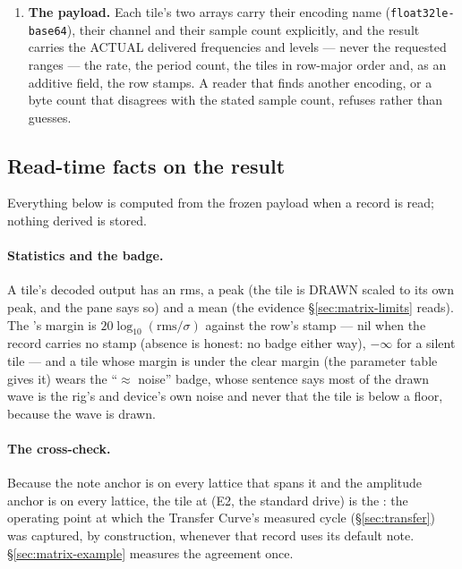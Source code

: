 \documentclass[11pt,a4paper]{article}
\begin{document}
{\begin{enumerate}
\item \textbf{The payload.} Each tile's two arrays carry their encoding
name (\texttt{float32le-base64}), their channel and their sample count
explicitly, and the result carries the ACTUAL delivered frequencies and
levels --- never the requested ranges --- the rate, the period count, the
tiles in row-major order and, as an additive field, the row stamps. A
reader that finds another encoding, or a byte count that disagrees with
the stated sample count, refuses rather than guesses.
\end{enumerate}
\par}

\subsection{Read-time facts on the result}
\label{sec:matrix-readtime}
Everything below is computed from the frozen payload when a record is
read; nothing derived is stored.

\paragraph{Statistics and the badge.} A tile's decoded output has an
rms, a peak (the tile is DRAWN scaled to its own peak, and the pane says
so) and a mean (the evidence \S\ref{sec:matrix-limits} reads). The
's margin is
$20\log_{10}(\mathrm{rms} / \sigma)$ against the row's stamp --- nil when
the record carries no stamp (absence is honest: no badge either way),
$-\infty$ for a silent tile --- and a tile whose margin is under the
clear margin (the parameter table gives it) wears the ``$\approx$ noise''
badge, whose sentence says most of the drawn wave is the rig's and
device's own noise and never that the tile is below a floor, because the
wave is drawn.

\paragraph{The cross-check.} Because the note anchor is on every lattice
that spans it and the amplitude anchor is on every lattice, the tile at
(E2, the standard drive) is the : the operating
point at which the Transfer Curve's measured cycle (\S\ref{sec:transfer})
was captured, by construction, whenever that record uses its default
note. \S\ref{sec:matrix-example} measures the agreement once.
\end{document}
